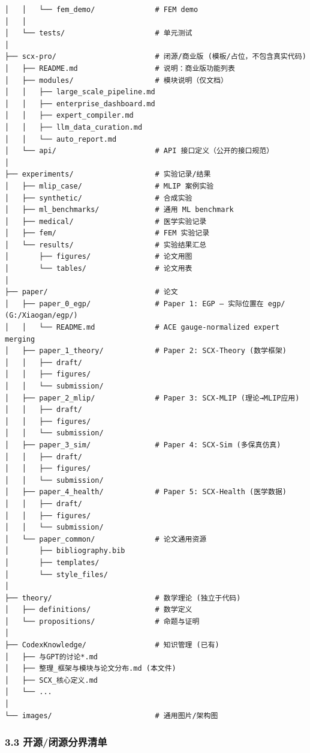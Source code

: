 \documentclass[
  12pt,
]{ctexart}
\begin{document}
\begin{verbatim}
│   │   └── fem_demo/              # FEM demo
│   │
│   └── tests/                     # 单元测试
│
├── scx-pro/                       # 闭源/商业版 (模板/占位，不包含真实代码)
│   ├── README.md                  # 说明：商业版功能列表
│   ├── modules/                   # 模块说明（仅文档）
│   │   ├── large_scale_pipeline.md
│   │   ├── enterprise_dashboard.md
│   │   ├── expert_compiler.md
│   │   ├── llm_data_curation.md
│   │   └── auto_report.md
│   └── api/                       # API 接口定义（公开的接口规范）
│
├── experiments/                   # 实验记录/结果
│   ├── mlip_case/                 # MLIP 案例实验
│   ├── synthetic/                 # 合成实验
│   ├── ml_benchmarks/             # 通用 ML benchmark
│   ├── medical/                   # 医学实验记录
│   ├── fem/                       # FEM 实验记录
│   └── results/                   # 实验结果汇总
│       ├── figures/               # 论文用图
│       └── tables/                # 论文用表
│
├── paper/                         # 论文
│   ├── paper_0_egp/               # Paper 1: EGP — 实际位置在 egp/ (G:/Xiaogan/egp/)
│   │   └── README.md              # ACE gauge-normalized expert merging
│   ├── paper_1_theory/            # Paper 2: SCX-Theory (数学框架)
│   │   ├── draft/
│   │   ├── figures/
│   │   └── submission/
│   ├── paper_2_mlip/              # Paper 3: SCX-MLIP (理论→MLIP应用)
│   │   ├── draft/
│   │   ├── figures/
│   │   └── submission/
│   ├── paper_3_sim/               # Paper 4: SCX-Sim (多保真仿真)
│   │   ├── draft/
│   │   ├── figures/
│   │   └── submission/
│   ├── paper_4_health/            # Paper 5: SCX-Health (医学数据)
│   │   ├── draft/
│   │   ├── figures/
│   │   └── submission/
│   └── paper_common/              # 论文通用资源
│       ├── bibliography.bib
│       ├── templates/
│       └── style_files/
│
├── theory/                        # 数学理论 (独立于代码)
│   ├── definitions/               # 数学定义
│   └── propositions/              # 命题与证明
│
├── CodexKnowledge/                # 知识管理 (已有)
│   ├── 与GPT的讨论*.md
│   ├── 整理_框架与模块与论文分布.md (本文件)
│   ├── SCX_核心定义.md
│   └── ...
│
└── images/                        # 通用图片/架构图
\end{verbatim}

\subsubsection{3.3
开源/闭源分界清单}\label{ux5f00ux6e90ux95edux6e90ux5206ux754cux6e05ux5355}
\end{document}
